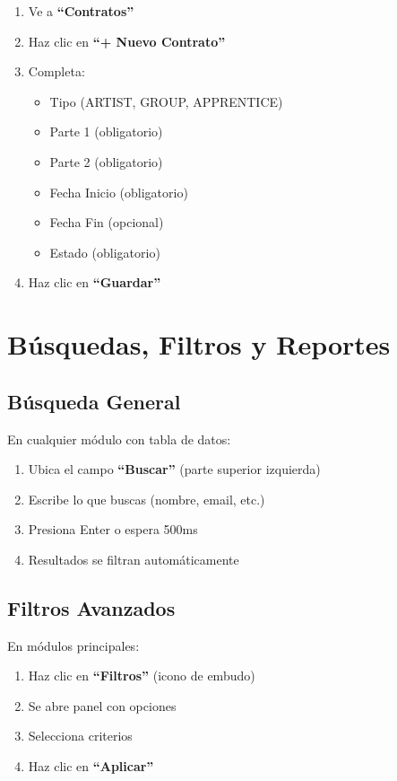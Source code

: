 \documentclass[12pt,a4paper,spanish,oneside]{report}
\begin{document}
\begin{enumerate}
    \item Ve a \textbf{``Contratos''}
    \item Haz clic en \textbf{``+ Nuevo Contrato''}
    \item Completa:
    \begin{itemize}
        \item Tipo (ARTIST, GROUP, APPRENTICE)
        \item Parte 1 (obligatorio)
        \item Parte 2 (obligatorio)
        \item Fecha Inicio (obligatorio)
        \item Fecha Fin (opcional)
        \item Estado (obligatorio)
    \end{itemize}
    \item Haz clic en \textbf{``Guardar''}
\end{enumerate}

\chapter{Búsquedas, Filtros y Reportes}

\section{Búsqueda General}

En cualquier módulo con tabla de datos:

\begin{enumerate}
    \item Ubica el campo \textbf{``Buscar''} (parte superior izquierda)
    \item Escribe lo que buscas (nombre, email, etc.)
    \item Presiona Enter o espera 500ms
    \item Resultados se filtran automáticamente
\end{enumerate}

\section{Filtros Avanzados}

En módulos principales:

\begin{enumerate}
    \item Haz clic en \textbf{``Filtros''} (icono de embudo)
    \item Se abre panel con opciones
    \item Selecciona criterios
    \item Haz clic en \textbf{``Aplicar''}
\end{enumerate}
\end{document}
